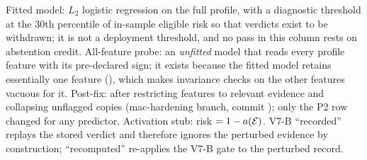 \begin{table}[!t]
\parbox{\textwidth}{\scriptsize Fitted model: $L_2$ logistic regression on the full profile, with a diagnostic threshold at the 30th percentile of in-sample eligible risk so that \NDO{} verdicts exist to be withdrawn; it is not a deployment threshold, and no pass in this column rests on abstention credit. All-feature probe: an \emph{unfitted} model that reads every profile feature with its pre-declared sign; it exists because the fitted model retains essentially one feature (), which makes invariance checks on the other features vacuous for it. Post-fix: after restricting features to relevant evidence and collapsing unflagged copies (mac-hardening branch, commit ); only the P2 row changed for any predictor. Activation stub: risk $=1-a(\mathcal{E})$. V7-B ``recorded'' replays the stored verdict and therefore ignores the perturbed evidence by construction; ``recomputed'' re-applies the V7-B gate to the perturbed record.}
\end{table}
